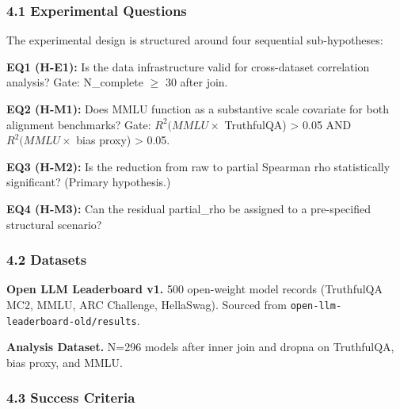
\subsubsection{4.1 Experimental Questions}

The experimental design is structured around four sequential sub-hypotheses:

\textbf{EQ1 (H-E1):} Is the data infrastructure valid for cross-dataset correlation analysis? Gate: N\_complete $\geq$ 30 after join.

\textbf{EQ2 (H-M1):} Does MMLU function as a substantive scale covariate for both alignment benchmarks? Gate: $R^{2}(MMLU \times$ TruthfulQA) > 0.05 AND $R^{2}(MMLU \times$ bias proxy) > 0.05.

\textbf{EQ3 (H-M2):} Is the reduction from raw to partial Spearman rho statistically significant? (Primary hypothesis.)

\textbf{EQ4 (H-M3):} Can the residual partial\_rho be assigned to a pre-specified structural scenario?

\subsubsection{4.2 Datasets}

\textbf{Open LLM Leaderboard v1.} 500 open-weight model records (TruthfulQA MC2, MMLU, ARC Challenge, HellaSwag). Sourced from \texttt{open-llm-leaderboard-old/results}.

\textbf{Analysis Dataset.} N=296 models after inner join and dropna on TruthfulQA, bias proxy, and MMLU.

\subsubsection{4.3 Success Criteria}

\begin{table}[htbp]
\centering
{}
\end{table}

